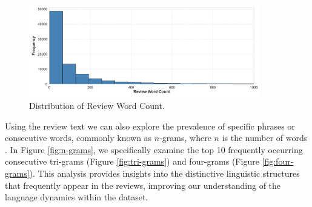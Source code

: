 \begin{figure}[h]
  \centering
  \includegraphics[width=0.9\textwidth]{Figures/distribution_of_review_word_count.pdf} %
  \caption{Distribution of Review Word Count.}
  \label{fig:distribution of word count}
\end{figure}

Using the review text we can also explore the prevalence of specific phrases or consecutive words, commonly known as $n$-grams, where $n$ is the number of words \cite{mcauley2013hidden}. In Figure \ref{fig:n-grams}, we specifically examine the top 10 frequently occurring consecutive tri-grams (Figure \ref{fig:tri-grams}) and four-grams (Figure \ref{fig:four-grams}). This analysis provides insights into the distinctive linguistic structures that frequently appear in the reviews, improving our understanding of the language dynamics within the dataset.

